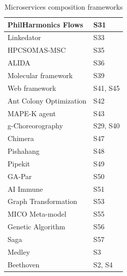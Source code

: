 \documentclass{article}
\begin{document}
\begin{multicols}{2}
\begin{table}[ht!]
\begin{center}
\begin{tabular}{ | m{20em} | m{20em} | }
PhilHarmonics   Flows                        & S31                                        \\ \hline
Linkedator                                   & S33                                        \\ \hline
HPCSOMAS-MSC                                 & S35                                        \\ \hline
ALIDA                                        & S36                                        \\ \hline
Molecular   framework                        & S39                                        \\ \hline
Web   framework                              & S41,   S45                                 \\ \hline
Ant   Colony Optimization                    & S42                                        \\ \hline
MAPE-K   agent                               & S43                                        \\ \hline
g-Choreorography                             & S29,   S40                                 \\ \hline
Chimera                                      & S47                                        \\ \hline
Pishahang                                    & S48                                        \\ \hline
Pipekit                                      & S49                                        \\ \hline
GA-Par                                       & S50                                        \\ \hline
AI   Immune                                  & S51                                        \\ \hline
Graph   Transformation                       & S53                                        \\ \hline
MICO   Meta-model                            & S55                                        \\ \hline
Genetic   Algorithm                          & S56                                        \\ \hline
Saga                                         & S57                                        \\ \hline
Medley                                       & S3                                         \\ \hline
Beethoven                                    & S2, S4                                     \\ \hline
\end{tabular}
\end{center}
\caption{Microservices composition frameworks}
\label{table:2}
\end{table}


\end{multicols}
\end{document}

